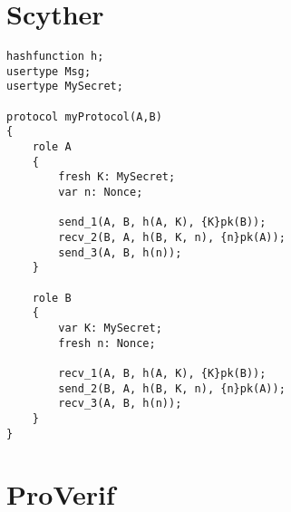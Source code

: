 \documentclass[10pt,a4paper]{article}
\begin{document}








\section{Scyther}

\begin{Verbatim}[fontsize=\scriptsize]
hashfunction h;
usertype Msg;
usertype MySecret;

protocol myProtocol(A,B)
{
	role A
	{
		fresh K: MySecret;
		var n: Nonce;

		send_1(A, B, h(A, K), {K}pk(B));
		recv_2(B, A, h(B, K, n), {n}pk(A));
		send_3(A, B, h(n));
	}	
	
	role B
	{
		var K: MySecret;
		fresh n: Nonce;

		recv_1(A, B, h(A, K), {K}pk(B));
		send_2(B, A, h(B, K, n), {n}pk(A));
		recv_3(A, B, h(n));
	}
}
\end{Verbatim}



\section{ProVerif}
\end{document}
